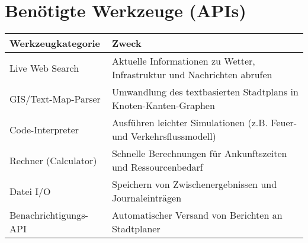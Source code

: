 \documentclass[a4paper,12pt]{scrartcl}
\begin{document}
\section{Benötigte Werkzeuge (APIs)}
\begin{tabular}{@{}ll@{}}
\toprule
\textbf{Werkzeugkategorie} & \textbf{Zweck} \\
\midrule
Live Web Search    & Aktuelle Informationen zu Wetter, Infrastruktur und Nachrichten abrufen \\
GIS/Text-Map-Parser & Umwandlung des textbasierten Stadtplans in Knoten-Kanten-Graphen \\
Code-Interpreter    & Ausführen leichter Simulationen (z.B. Feuer- und Verkehrsflussmodell) \\
Rechner (Calculator)         & Schnelle Berechnungen für Ankunftszeiten und Ressourcenbedarf \\
Datei I/O           & Speichern von Zwischenergebnissen und Journaleinträgen \\
Benachrichtigungs-API & Automatischer Versand von Berichten an Stadtplaner \\
\bottomrule
\end{tabular}
\end{document}
